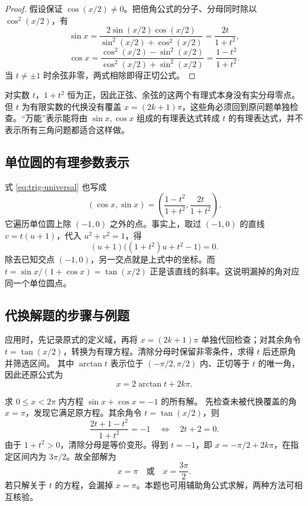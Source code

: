 \documentclass[UTF8,12pt,a4paper,fontset=fandol]{ctexart}
\begin{document}
\begin{proof}
假设保证 $\cos(x/2)\ne0$。把倍角公式的分子、分母同时除以 $\cos^2(x/2)$，有
\[
  \sin x=
  \frac{2\sin(x/2)\cos(x/2)}{\sin^2(x/2)+\cos^2(x/2)}
  =\frac{2t}{1+t^2},
\]
\[
  \cos x=
  \frac{\cos^2(x/2)-\sin^2(x/2)}{\cos^2(x/2)+\sin^2(x/2)}
  =\frac{1-t^2}{1+t^2}.
\]
当 $t\ne\pm1$ 时余弦非零，两式相除即得正切公式。
\end{proof}

对实数 $t$，$1+t^2$ 恒为正，因此正弦、余弦的这两个有理式本身没有实分母零点。但 $t$ 为有限实数的代换没有覆盖 $x=(2k+1)\pi$，这些角必须回到原问题单独检查。“万能”表示能将由 $\sin x,\cos x$ 组成的有理表达式转成 $t$ 的有理表达式，并不表示所有三角问题都适合这样做。

\subsection{单位圆的有理参数表示}

式 \eqref{eq:trig-universal} 也写成
\[
  (\cos x,\sin x)=\left(\frac{1-t^2}{1+t^2},\frac{2t}{1+t^2}\right).
\]
它遍历单位圆上除 $(-1,0)$ 之外的点。事实上，取过 $(-1,0)$ 的直线 $v=t(u+1)$，代入 $u^2+v^2=1$，得
\[
  (u+1)\bigl((1+t^2)u+t^2-1\bigr)=0.
\]
除去已知交点 $(-1,0)$，另一交点就是上式中的坐标。而 $t=\sin x/(1+\cos x)=\tan(x/2)$ 正是该直线的斜率。这说明漏掉的角对应同一个单位圆点。

\subsection{代换解题的步骤与例题}

应用时，先记录原式的定义域，再将 $x=(2k+1)\pi$ 单独代回检查；对其余角令 $t=\tan(x/2)$，转换为有理方程。清除分母时保留非零条件，求得 $t$ 后还原角并筛选区间。
其中 $\arctan t$ 表示位于 $(-\pi/2,\pi/2)$ 内、正切等于 $t$ 的唯一角，因此还原公式为
\begin{equation}\label{eq:trig-t-back}
  x=2\arctan t+2k\pi.
\end{equation}

\begin{example}[万能代换与遗漏角的检查]
求 $0\le x<2\pi$ 内方程 $\sin x+\cos x=-1$ 的所有解。
先检查未被代换覆盖的角 $x=\pi$，发现它满足原方程。其余角令 $t=\tan(x/2)$，则
\[
  \frac{2t+1-t^2}{1+t^2}=-1
  \quad\Longleftrightarrow\quad 2t+2=0.
\]
由于 $1+t^2>0$，清除分母是等价变形。得到 $t=-1$，即 $x=-\pi/2+2k\pi$，在指定区间内为 $3\pi/2$。故全部解为
\[
  x=\pi\quad\text{或}\quad x=\frac{3\pi}{2}.
\]
若只解关于 $t$ 的方程，会漏掉 $x=\pi$。本题也可用辅助角公式求解，两种方法可相互核验。
\end{example}
\end{document}
